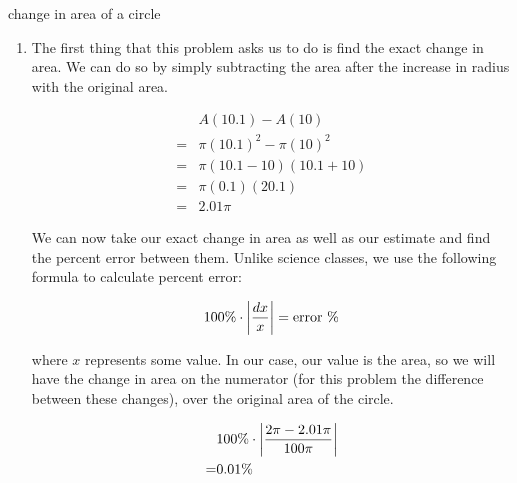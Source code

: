 \begin{examplebreak}{change in area of a circle}
\begin{enumerate}
        \item The first thing that this problem asks us to do is find the exact change in area. We can do so by simply subtracting the area after the increase in radius with the original area.
        
        \begin{align*}
            &A \left( 10.1 \right) - A \left( 10 \right) \\
            = &\pi \left( 10.1 \right)^2 - \pi \left( 10 \right)^2 \\
            = &\pi \left( 10.1 - 10 \right) \left( 10.1 + 10 \right) \\
            = &\pi \left( 0.1 \right) \left( 20.1 \right) \\
            = &2.01 \pi
        \end{align*}
        
        We can now take our exact change in area as well as our estimate and find the percent error between them. Unlike science classes, we use the following formula to calculate percent error:
        
        \[ 100 \% \cdot \left\lvert {\dfrac{dx}{x}} \right\rvert = \text{error \%} \]
        
        where \( x \) represents some value. In our case, our value is the area, so we will have the change in area on the numerator (for this problem the difference between these changes), over the original area of the circle.
        
        \begin{align*}
            &100 \% \cdot \left\lvert {\dfrac{2 \pi - 2.01 \pi}{100 \pi}} \right\rvert \\
            = &0.01 \%
        \end{align*}
    \end{enumerate}
\end{examplebreak}

\newpage

